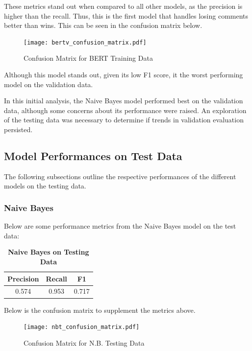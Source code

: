 \documentclass[twocolumn]{article}
\begin{document}
These metrics stand out when compared to all other models, as the precision is higher than the recall. Thus, this is the first model that handles losing comments better than wins. This can be seen in the confusion matrix below.

\begin{figure}[H]
    \centering
    \texttt{[image: bertv\_confusion\_matrix.pdf]}
    \caption{Confusion Matrix for BERT Training Data}
\end{figure}

Although this model stands out, given its low F1 score, it the worst performing model on the validation data.

In this initial analysis, the Naive Bayes model performed best on the validation data, although some concerns about its performance were raised. An exploration of the testing data was necessary to determine if trends in validation evaluation persisted.

\subsection{Model Performances on Test Data}

The following subsections outline the respective performances of the different models on the testing data.

\subsubsection{Naive Bayes}

Below are some performance metrics from the Naive Bayes model on the test data:

\begin{table}[H]
\centering %
\caption{\textbf{Naive Bayes on Testing Data}} 

\begin{tabular}{ccc} 
\toprule
Precision & Recall & F1 \\ 
\midrule
0.574 & 0.953 & 0.717 \\
\bottomrule
\end{tabular}
\end{table}

Below is the confusion matrix to supplement the metrics above.

\begin{figure}[H]
    \centering
    \texttt{[image: nbt\_confusion\_matrix.pdf]}
    \caption{Confusion Matrix for N.B. Testing Data}
\end{figure}
\end{document}
